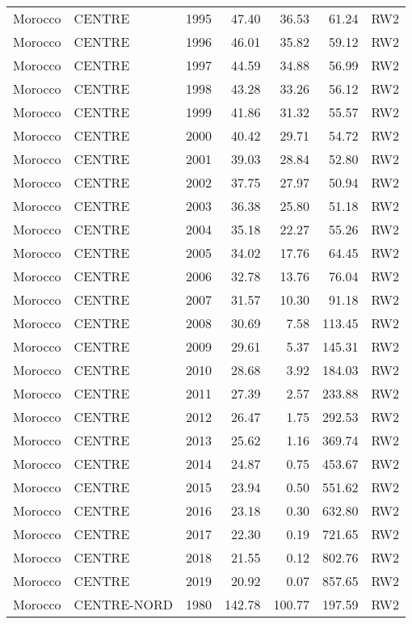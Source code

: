 \begin{longtable}{lllrrrl}
  Morocco & CENTRE & 1995 & 47.40 & 36.53 & 61.24 & RW2 \\ 
  Morocco & CENTRE & 1996 & 46.01 & 35.82 & 59.12 & RW2 \\ 
  Morocco & CENTRE & 1997 & 44.59 & 34.88 & 56.99 & RW2 \\ 
  Morocco & CENTRE & 1998 & 43.28 & 33.26 & 56.12 & RW2 \\ 
  Morocco & CENTRE & 1999 & 41.86 & 31.32 & 55.57 & RW2 \\ 
  Morocco & CENTRE & 2000 & 40.42 & 29.71 & 54.72 & RW2 \\ 
  Morocco & CENTRE & 2001 & 39.03 & 28.84 & 52.80 & RW2 \\ 
  Morocco & CENTRE & 2002 & 37.75 & 27.97 & 50.94 & RW2 \\ 
  Morocco & CENTRE & 2003 & 36.38 & 25.80 & 51.18 & RW2 \\ 
  Morocco & CENTRE & 2004 & 35.18 & 22.27 & 55.26 & RW2 \\ 
  Morocco & CENTRE & 2005 & 34.02 & 17.76 & 64.45 & RW2 \\ 
  Morocco & CENTRE & 2006 & 32.78 & 13.76 & 76.04 & RW2 \\ 
  Morocco & CENTRE & 2007 & 31.57 & 10.30 & 91.18 & RW2 \\ 
  Morocco & CENTRE & 2008 & 30.69 & 7.58 & 113.45 & RW2 \\ 
  Morocco & CENTRE & 2009 & 29.61 & 5.37 & 145.31 & RW2 \\ 
  Morocco & CENTRE & 2010 & 28.68 & 3.92 & 184.03 & RW2 \\ 
  Morocco & CENTRE & 2011 & 27.39 & 2.57 & 233.88 & RW2 \\ 
  Morocco & CENTRE & 2012 & 26.47 & 1.75 & 292.53 & RW2 \\ 
  Morocco & CENTRE & 2013 & 25.62 & 1.16 & 369.74 & RW2 \\ 
  Morocco & CENTRE & 2014 & 24.87 & 0.75 & 453.67 & RW2 \\ 
  Morocco & CENTRE & 2015 & 23.94 & 0.50 & 551.62 & RW2 \\ 
  Morocco & CENTRE & 2016 & 23.18 & 0.30 & 632.80 & RW2 \\ 
  Morocco & CENTRE & 2017 & 22.30 & 0.19 & 721.65 & RW2 \\ 
  Morocco & CENTRE & 2018 & 21.55 & 0.12 & 802.76 & RW2 \\ 
  Morocco & CENTRE & 2019 & 20.92 & 0.07 & 857.65 & RW2 \\ 
  Morocco & CENTRE-NORD & 1980 & 142.78 & 100.77 & 197.59 & RW2 \\ 

\end{longtable}
